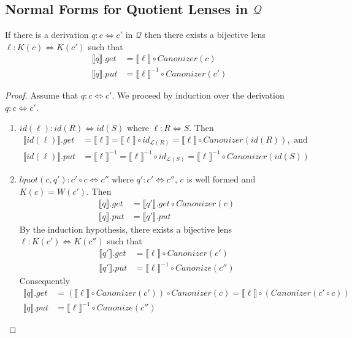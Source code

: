 \documentclass{svproc}
\begin{document}
\subsection{Normal Forms for Quotient Lenses in $\mathcal{Q}$}
\begin{claim}
If there is a derivation $q : c \Leftrightarrow c'$ in
$\mathcal{Q}$ then there exists a bijective lens $\ell : K(c) \Leftrightarrow
K(c')$ such that
\begin{align*}
\llbracket q \rrbracket.get &= \llbracket \ell \rrbracket\circ Canonizer(c)\\
\llbracket q \rrbracket.put &= \llbracket \ell \rrbracket^{-1} \circ
Canonizer(c')
\end{align*}
\end{claim}
\begin{proof}
Assume that $q : c \Leftrightarrow c'$. We proceed by induction over the
derivation $q : c \Leftrightarrow c'$.
\begin{enumerate}
  \item
  $id(\ell): id(R) \Leftrightarrow id(S)$ where $\ell : R \Leftrightarrow
S$. Then
  \begin{align*}
  \llbracket id(\ell) \rrbracket.get &=  \llbracket \ell \rrbracket = \llbracket \ell \rrbracket \circ
  id_{\mathcal{L}(R)} = \llbracket \ell \rrbracket \circ Canonizer(id(R)), \text{ and }\\
  \llbracket id(\ell) \rrbracket.put &= \llbracket \ell \rrbracket^{-1} = \llbracket \ell \rrbracket^{-1} \circ
  id_{\mathcal{L}(S)} = \llbracket \ell \rrbracket^{-1} \circ Canonizer(id(S))
  \end{align*}
  \item
  $lquot(c, q'): c' \circ c \Leftrightarrow c''$ where $q' : c' 
  \Leftrightarrow c''$, $c$ is well formed and $K(c) = W(c')$. Then
\begin{align*}
  \llbracket q \rrbracket.get  &= \llbracket q'
  \rrbracket.get \circ Canonizer(c)\\
  \llbracket q \rrbracket.put &= \llbracket q' \rrbracket.put
  \end{align*}
  By the induction hypothesis, there exists a bijective lens $\ell :
  K(c') \Leftrightarrow K(c'')$ such that 
  \begin{align*}
\llbracket q' \rrbracket.get &= \llbracket \ell \rrbracket \circ Canonizer(c')\\
\llbracket q' \rrbracket.put &= \llbracket \ell \rrbracket^{-1} \circ
Canonize(c'')
\end{align*}
Consequently
\begin{align*}
  \llbracket q \rrbracket.get  &= (\llbracket \ell \rrbracket \circ
  Canonizer(c')) \circ Canonizer(c) = \llbracket \ell \rrbracket \circ
  (Canonizer(c' \circ c))\\
  \llbracket q \rrbracket.put &= \llbracket \ell \rrbracket^{-1} \circ
  Canonize(c'')
  \end{align*}


\end{enumerate}
\end{proof}
\end{document}
